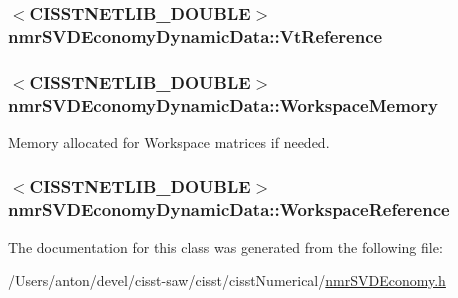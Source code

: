 \subsubsection[{Vt\+Reference}]{$<$C\+I\+S\+S\+T\+N\+E\+T\+L\+I\+B\+\_\+\+D\+O\+U\+B\+L\+E$>$ nmr\+S\+V\+D\+Economy\+Dynamic\+Data\+::\+Vt\+Reference\hspace{0.3cm}{\ttfamily [protected]}}\label{classnmr_s_v_d_economy_dynamic_data_adf2c8ef077330ba421fccf814cfffc58}
\hypertarget{classnmr_s_v_d_economy_dynamic_data_a7e195abf076d992a6c1d4a29ec76be91}{}
\subsubsection[{Workspace\+Memory}]{$<$C\+I\+S\+S\+T\+N\+E\+T\+L\+I\+B\+\_\+\+D\+O\+U\+B\+L\+E$>$ nmr\+S\+V\+D\+Economy\+Dynamic\+Data\+::\+Workspace\+Memory\hspace{0.3cm}{\ttfamily [protected]}}\label{classnmr_s_v_d_economy_dynamic_data_a7e195abf076d992a6c1d4a29ec76be91}
Memory allocated for Workspace matrices if needed. \hypertarget{classnmr_s_v_d_economy_dynamic_data_a0f1d57b8c7b8756b73ae5c72e3b2037a}{}
\subsubsection[{Workspace\+Reference}]{$<$C\+I\+S\+S\+T\+N\+E\+T\+L\+I\+B\+\_\+\+D\+O\+U\+B\+L\+E$>$ nmr\+S\+V\+D\+Economy\+Dynamic\+Data\+::\+Workspace\+Reference\hspace{0.3cm}{\ttfamily [protected]}}\label{classnmr_s_v_d_economy_dynamic_data_a0f1d57b8c7b8756b73ae5c72e3b2037a}


The documentation for this class was generated from the following file\+:\begin{DoxyCompactItemize}
\item 
/\+Users/anton/devel/cisst-\/saw/cisst/cisst\+Numerical/\hyperlink{nmr_s_v_d_economy_8h}{nmr\+S\+V\+D\+Economy.\+h}\end{DoxyCompactItemize}
